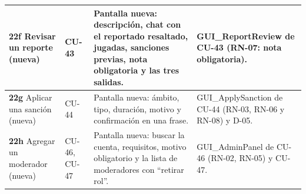 \begin{center}
\begin{longtable}{|L{0.1\textwidth}|L{0.13\textwidth}|L{0.335\textwidth}|L{0.32\textwidth}|}
\textbf{22f} Revisar un reporte (nueva) & \mbox{CU-43} & Pantalla nueva: descripción, chat con el reportado resaltado, jugadas, sanciones previas, nota obligatoria y las tres salidas. & GUI\_ReportReview de \mbox{CU-43} (\mbox{RN-07}: nota obligatoria). \\ \hline
\textbf{22g} Aplicar una sanción (nueva) & \mbox{CU-44} & Pantalla nueva: ámbito, tipo, duración, motivo y confirmación en una frase. & GUI\_ApplySanction de \mbox{CU-44} (\mbox{RN-03}, \mbox{RN-06} y \mbox{RN-08}) y \mbox{D-05}. \\ \hline
\textbf{22h} Agregar un moderador (nueva) & \mbox{CU-46}, \mbox{CU-47} & Pantalla nueva: buscar la cuenta, requisitos, motivo obligatorio y la lista de moderadores con ``retirar rol''. & GUI\_AdminPanel de \mbox{CU-46} (\mbox{RN-02}, \mbox{RN-05}) y \mbox{CU-47}. \\ \hline
\end{longtable}
\end{center}
